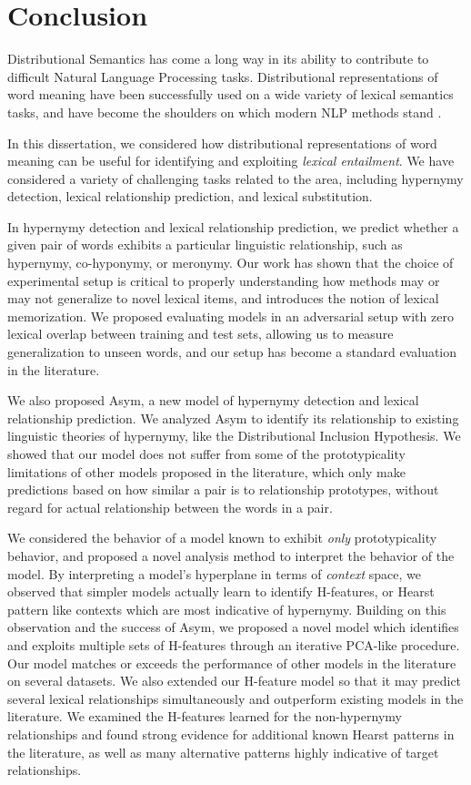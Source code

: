 \chapter{Conclusion}
\label{ch:conclusion}

Distributional Semantics has come a long way in its ability to contribute
to difficult Natural Language Processing tasks. Distributional representations
of word meaning have been successfully used on a wide variety of lexical semantics
tasks, and have become the shoulders on which modern NLP methods stand
\cite{goldberg:2016:jair}.

In this dissertation, we considered how distributional representations of word
meaning can be useful for identifying and exploiting {\em lexical entailment}.
We have considered a variety of challenging tasks related to the area,
including hypernymy detection, lexical relationship prediction, and lexical
substitution.

In hypernymy detection and lexical relationship prediction, we predict
whether a given pair of words exhibits a particular linguistic relationship,
such as hypernymy, co-hyponymy, or meronymy.
Our work has shown that the choice of experimental setup is critical to properly
understanding how methods may or may not generalize to novel lexical items,
and introduces the notion of lexical memorization. We proposed evaluating models
in an adversarial setup with zero lexical overlap between training and test
sets, allowing us to measure generalization to unseen words, and our
setup has become a standard evaluation in the literature.

We also proposed Asym, a new model of hypernymy detection and
lexical relationship prediction. We analyzed Asym to identify
its relationship to existing linguistic theories of hypernymy, like the
Distributional Inclusion Hypothesis. We showed that our model does not suffer
from some of the prototypicality limitations of other models proposed in the
literature, which only make predictions based on how similar a pair is to
relationship prototypes, without regard for actual relationship between the
words in a pair.

We considered the behavior of a model known to exhibit {\em only}
prototypicality behavior, and proposed a novel analysis method to interpret the
behavior of the model. By interpreting a model's hyperplane in terms of {\em
context} space, we observed that simpler models actually
learn to identify H-features, or Hearst pattern like contexts which are most
indicative of hypernymy. Building on this observation and the success of
Asym, we proposed a novel model which identifies and exploits multiple sets of
H-features through an iterative PCA-like procedure. Our model matches or
exceeds the performance of other models in the literature on several datasets.
We also extended our H-feature model so that it may predict several lexical
relationships simultaneously and outperform existing models in the literature.
We examined the H-features learned for the non-hypernymy relationships and
found strong evidence for additional known Hearst patterns in the literature,
as well as many alternative patterns highly indicative of target relationships.

